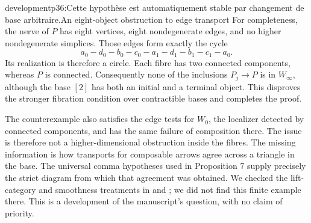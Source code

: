 \begin{dcomment}{development}{p36:Cette hypothèse est automatiquement stable par changement de base arbitraire.}{An eight-object obstruction to edge transport}
For completeness, the nerve of $P$ has eight vertices, eight nondegenerate edges, and no higher nondegenerate simplices. Those edges form exactly the cycle
\[
 a_0-d_0-b_0-c_0-a_1-d_1-b_1-c_1-a_0.
\]
Its realization is therefore a circle. Each fibre has two connected components, whereas $P$ is connected. Consequently none of the inclusions $P_j\to P$ is in $W_\infty$, although the base $[2]$ has both an initial and a terminal object. This disproves the stronger fibration condition over contractible bases and completes the proof.

The counterexample also satisfies the edge tests for $W_0$, the localizer detected by connected components, and has the same failure of composition there. The issue is therefore not a higher-dimensional obstruction inside the fibres. The missing information is how transports for composable arrows agree across a triangle in the base. The universal comma hypotheses used in Proposition 7 supply precisely the strict diagram from which that agreement was obtained. We checked the lift-category and smoothness treatments in \citet[\S4]{Maltsiniotis2005Asphericite} and \citet[\S\S1--2]{Maltsiniotis2012Exact}; we did not find this finite example there. This is a development of the manuscript's question, with no claim of priority.
\end{dcomment}

